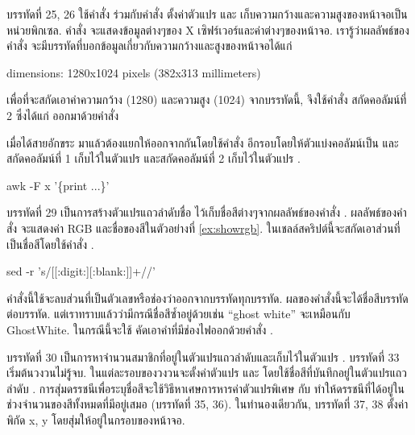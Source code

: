 \begin{thwbr}
บรรทัดที่ 25, 26 ใช้คำสั่ง  ร่วมกับคำสั่ง  ตั้งค่าตัวแปร  และ  เก็บความกว้างและความสูงของหน้าจอเป็นหน่วยพิกเซล. คำสั่ง  จะแสดงข้อมูลต่างๆของ X เซิฟร์เวอร์และค่าต่างๆของหน้าจอ. เรารู้ว่าผลลัพธ์ของคำสั่ง  จะมีบรรทัดที่บอกข้อมูลเกี่ยวกับความกว้างและสูงของหน้าจอได้แก่

\medskip
\begin{MyEx}
  dimensions:    1280x1024 pixels (382x313 millimeters)
\end{MyEx}
\medskip

เพื่อที่จะสกัดเอาค่าความกว้าง (1280) และความสูง (1024) จากบรรทัดนี้, จึงใช้คำสั่ง  สกัดคอลัมน์ที่ 2 ซึ่งได้แก่  ออกมาด้วยคำสั่ง 


\medskip
{}
\medskip

เมื่อได้สายอักขระ  มาแล้วต้องแยกให้ออกจากกันโดยใช้คำสั่ง  อีกรอบโดยให้ตัวแบ่งคอลัมน์เป็น  และสกัดคอลัมน์ที่ 1 เก็บไว้ในตัวแปร  และสกัดคอลัมน์ที่ 2 เก็บไว้ในตัวแปร . 

\medskip
\begin{MyEx}
awk -F x '\{print ...\}'
\end{MyEx}
\medskip

บรรทัดที่ 29 เป็นการสร้างตัวแปรแถวลำดับชื่อ  ไว้เก็บชื่อสีต่างๆจากผลลัพธ์ของคำสั่ง . ผลลัพธ์ของคำสั่ง  จะแสดงค่า RGB และชื่อของสีในตัวอย่างที่ \ref{ex:showrgb}. ในเชลล์สคริปต์นี้จะสกัดเอาส่วนที่เป็นชื่อสีโดยใช้คำสั่ง .

\medskip
\begin{MyEx}
sed -r 's/[[:digit:][:blank:]]+//'
\end{MyEx}
\medskip

คำสั่งนี้ใช้จะลบส่วนที่เป็นตัวเลขหรือช่องว่าออกจากบรรทัดทุกบรรทัด. ผลของคำสั่งนี้จะได้ชื่อสีบรรทัดต่อบรรทัด. แต่เราทราบแล้วว่ามีกรณีชื่อสีซ้ำอยู่ด้วยเช่น ``ghost white'' จะเหมือนกับ GhostWhite. ในกรณีนี้จะใช้  คัดเอาคำที่มีช่องไฟออกด้วยคำสั่ง .

บรรทัดที่ 30 เป็นการหาจำนวนสมาชิกที่อยู่ในตัวแปรแถวลำดับและเก็บไว้ในตัวแปร . บรรทัดที่ 33 เริ่มต้นวงวนไม่รู้จบ. ในแต่ละรอบของวงวนจะตั้งค่าตัวแปร  และ  โดยใช้ชื่อสีที่บันทึกอยู่ในตัวแปรแถวลำดับ . การสุ่มดรรชนีเพื่อระบุชื่อสีจะใช้วิธีหาเศษการหารค่าตัวแปรพิเศษ  กับ  ทำให้ดรรชนีที่ได้อยู่ในช่วงจำนวนของสีทั้งหมดที่มีอยู่เสมอ (บรรทัดที่ 35, 36). ในทำนองเดียวกัน, บรรทัดที่ 37, 38 ตั้งค่าพิกัด x, y โดยสุ่มให้อยู่ในกรอบของหน้าจอ.


\end{thwbr}
